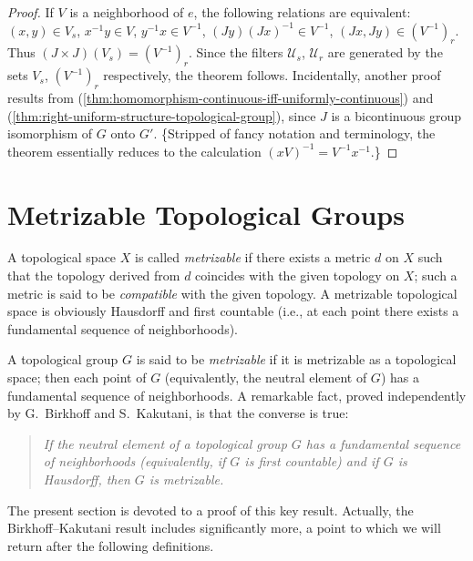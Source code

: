 \begin{proof}
    If \( V \) is a neighborhood of \( e \), the following relations are equivalent:
    \( (x, y) \in V_s \), \( x^{-1}y \in V \), \( y^{-1}x \in V^{-1} \), \( (Jy)(Jx)^{-1} \in V^{-1} \), \( (Jx, Jy) \in (V^{-1})_r \).
    Thus \( (J \times J)(V_s) = (V^{-1})_r \).
    Since the filters \( \mathcal{U}_s \), \( \mathcal{U}_r \) are generated by the sets \( V_s \), \( (V^{-1})_r \) respectively, the theorem follows.
    Incidentally, another proof results from (\ref{thm:homomorphism-continuous-iff-uniformly-continuous}) and (\ref{thm:right-uniform-structure-topological-group}), since \( J \) is a bicontinuous group isomorphism of \( G \) onto \( G' \).
    \{Stripped of fancy notation and terminology, the theorem essentially reduces to the calculation
    \( (xV)^{-1} = V^{-1}x^{-1}. \)\}
\end{proof}



\section{Metrizable Topological Groups}

A topological space \(X\) is called \emph{metrizable} if there exists a metric \(d\) on \(X\) such that the topology derived from \(d\) coincides with the given topology on \(X\); such a metric is said to be \emph{compatible} with the given topology.
A metrizable topological space is obviously Hausdorff and first countable (i.e., at each point there exists a fundamental sequence of neighborhoods).

A topological group \(G\) is said to be \emph{metrizable} if it is metrizable as a topological space; then each point of \(G\) (equivalently, the neutral element of \(G\)) has a fundamental sequence of neighborhoods.
A remarkable fact, proved independently by G.~Birkhoff and S.~Kakutani, is that the converse is true:

\begin{quote}
    \textit{If the neutral element of a topological group \(G\) has a fundamental sequence of neighborhoods (equivalently, if \(G\) is first countable) and if \(G\) is Hausdorff, then \(G\) is metrizable.}
\end{quote}

The present section is devoted to a proof of this key result. Actually, the Birkhoff--Kakutani result includes significantly more, a point to which we will return after the following definitions.


